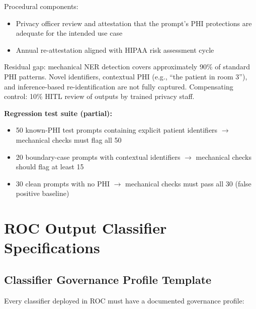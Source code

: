 Procedural components:
\begin{itemize}
  \item Privacy officer review and attestation that the prompt's PHI protections are adequate for the intended use case
  \item Annual re-attestation aligned with HIPAA risk assessment cycle
\end{itemize}


Residual gap: mechanical NER detection covers approximately 90\% of standard PHI patterns. Novel identifiers, contextual PHI (e.g., ``the patient in room 3''), and inference-based re-identification are not fully captured. Compensating control: 10\% HITL review of outputs by trained privacy staff.

\textbf{Regression test suite (partial):}
\begin{itemize}
  \item 50 known-PHI test prompts containing explicit patient identifiers $\to$ mechanical checks must flag all 50
  \item 20 boundary-case prompts with contextual identifiers $\to$ mechanical checks should flag at least 15
  \item 30 clean prompts with no PHI $\to$ mechanical checks must pass all 30 (false positive baseline)
\end{itemize}






\section{ROC Output Classifier Specifications}
\label{sec:templates-C-2}


\subsection{Classifier Governance Profile Template}
\label{sec:templates-C-2-1}


Every classifier deployed in ROC must have a documented governance profile:

